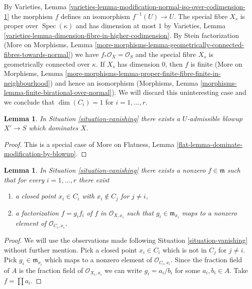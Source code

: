 \documentclass{stacks-project}
\theoremstyle{plain}
\newtheorem{lemma}[subsection]{Lemma}
\theoremstyle{definition}
\theoremstyle{remark}
\numberwithin{equation}{subsection}
\def\Spec{\mathop{\mathrm{Spec}}}
\begin{document}
\noindent
By Varieties, Lemma
\ref{varieties-lemma-modification-normal-iso-over-codimension-1}
the morphism $f$ defines an isomorphism $f^{-1}(U) \to U$.
The special fibre $X_s$ is proper over $\Spec(\kappa)$ and
has dimension at most $1$ by Varieties, Lemma
\ref{varieties-lemma-dimension-fibre-in-higher-codimension}.
By Stein factorization (More on Morphisms, Lemma
\ref{more-morphisms-lemma-geometrically-connected-fibres-towards-normal})
we have $f_*\mathcal{O}_X = \mathcal{O}_S$ and
the special fibre $X_s$ is geometrically connected over $\kappa$.
If $X_s$ has dimension $0$, then $f$ is finite
(More on Morphisms, Lemma
\ref{more-morphisms-lemma-proper-finite-fibre-finite-in-neighbourhood})
and hence an isomorphism
(Morphisms, Lemma \ref{morphisms-lemma-finite-birational-over-normal}).
We will discard this uninteresting case and we conclude that
$\dim(C_i) = 1$ for $i = 1, \ldots, r$.

\begin{lemma}
\label{lemma-dominate-by-scheme-modification}
In Situation \ref{situation-vanishing} there exists a $U$-admissible
blowup $X' \to S$ which dominates $X$.
\end{lemma}

\begin{proof}
This is a special case of
More on Flatness, Lemma \ref{flat-lemma-dominate-modification-by-blowup}.
\end{proof}

\begin{lemma}
\label{lemma-nice-meromorphic-function}
In Situation \ref{situation-vanishing} there exists a nonzero
$f \in \mathfrak m$ such that for every $i = 1, \ldots, r$ there exist
\begin{enumerate}
\item a closed point $x_i \in C_i$ with $x_i \not \in C_j$ for $j \not = i$,
\item a factorization $f = g_i f_i$ of $f$ in $\mathcal{O}_{X, x_i}$
such that $g_i \in \mathfrak m_{x_i}$ maps to a nonzero element
of $\mathcal{O}_{C_i, x_i}$.
\end{enumerate}
\end{lemma}

\begin{proof}
We will use the observations made following Situation \ref{situation-vanishing}
without further mention. Pick a closed point $x_i \in C_i$ which is not in
$C_j$ for $j \not = i$. Pick $g_i \in \mathfrak m_{x_i}$ which maps to a
nonzero element of $\mathcal{O}_{C_i, x_i}$. Since the fraction field of $A$
is the fraction field of $\mathcal{O}_{X_i, x_i}$ we can write
$g_i = a_i/b_i$ for some $a_i, b_i \in A$. Take $f = \prod a_i$.
\end{proof}
\end{document}
